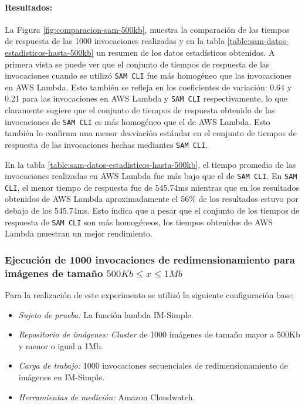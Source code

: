 \paragraph{Resultados:} La Figura \ref{fig:comparacion-sam-500kb}, muestra la comparación de los tiempos de respuesta de las 1000 invocaciones realizadas y en la tabla \ref{table:sam-datos-estadisticos-hasta-500kb} un resumen de los datos estadísticos obtenidos. A primera vista se puede ver que el conjunto de tiempos de respuesta de las invocaciones cuando se utilizó \texttt{SAM CLI} fue más homogéneo que las invocaciones en AWS Lambda. Esto también se refleja en los coeficientes de variación: 0.64 y 0.21 para las invocaciones en AWS Lambda y \texttt{SAM CLI} respectivamente, lo que claramente sugiere que el conjunto de tiempos de respuesta obtenido de las invocaciones de \texttt{SAM CLI} es más homogéneo que el de AWS Lambda. Esto también lo confirma una menor desviación estándar en el conjunto de tiempos de respuesta de las invocaciones hechas mediantes \texttt{SAM CLI}. 

En la tabla \ref{table:sam-datos-estadisticos-hasta-500kb}, el tiempo promedio de las invocaciones realizadas en AWS Lambda fue más bajo que el de \texttt{SAM CLI}. En \texttt{SAM CLI}, el menor tiempo de respuesta fue de 545.74ms mientras que en los resultados obtenidos de AWS Lambda aproximadamente el 56\% de los resultados estuvo por debajo de los 545.74ms. Esto indica que a pesar que el conjunto de los tiempos de respuesta de \texttt{SAM CLI} son más homogéneos, los tiempos obtenidos de AWS Lambda muestran un mejor rendimiento.

\subsubsection{Ejecución de 1000 invocaciones de redimensionamiento para imágenes de tamaño $500Kb \leq x \leq 1Mb$}

Para la realización de este experimento se utilizó la siguiente configuración base:
\begin{itemize}
    \item \emph{Sujeto de prueba:} La función lambda IM-Simple.
    \item \emph{Repositorio de imágenes:} \emph{Cluster} de 1000 imágenes de tamaño mayor a 500Kb y menor o igual a 1Mb.
    \item \emph{Carga de trabajo:} 1000 invocaciones secuenciales de redimensionamiento de imágenes en IM-Simple.
    \item \emph{Herramientas de medición:} Amazon Cloudwatch.
\end{itemize}


